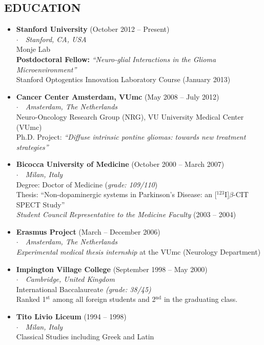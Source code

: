 \documentclass[line,margin]{res}
\newcommand{\superscript}[1]{\ensuremath{^{\textrm{#1}}}}
\newcommand{\titlestyle}[1]{{\bf #1}}
\newcommand{\placestyle}[1]{\footnotesize $\cdot$\ \ {\emph{#1}}}
\newcommand{\datestyle}[1]{{\tiny \dotfill} {\small (#1)}}
\begin{document}
\begin{resume}
\section{EDUCATION}
\begin{itemize}
\item {
  \titlestyle{Stanford University} \datestyle{October 2012 -- Present} \\
  { \placestyle{Stanford, CA, USA} } \\
  Monje Lab \\
  {\bf Postdoctoral Fellow:} \emph{``Neuro-glial Interactions in the Glioma Microenvironment''} \\
  Stanford Optogentics Innovation Laboratory Course \datestyle{January 2013}
}
\item {
  \titlestyle{Cancer Center Amsterdam, VUmc} \datestyle{May 2008 -- July 2012} \\
  { \placestyle{Amsterdam, The Netherlands} } \\
  Neuro-Oncology Research Group (NRG), VU University Medical Center (VUmc) \\
  Ph.D. Project: \emph{``Diffuse intrinsic pontine gliomas: towards new treatment strategies''}
}
\item {
  \titlestyle{Bicocca University of Medicine} \datestyle{October 2000 -- March 2007} \\
  { \placestyle{Milan, Italy} } \\
  Degree: Doctor of Medicine (\emph{grade: 109/110}) \\
  Thesis: {\small ``Non-dopaminergic systems in Parkinson's Disease: an [\superscript{123}I]$\beta$-CIT SPECT Study''} \\
  \emph{Student Council Representative to the Medicine Faculty} \datestyle{2003 -- 2004}
}
\item {
  \titlestyle{Erasmus Project} \datestyle{March -- December 2006} \\
  { \placestyle{Amsterdam, The Netherlands} } \\
  \emph{Experimental medical thesis internship} at the VUmc (Neurology Department)
}
\item {
  \titlestyle{Impington Village College} \datestyle{September 1998 -- May 2000} \\
  { \placestyle{Cambridge, United Kingdom} } \\
  International Baccalaureate \emph{(grade: 38/45)} \\
  Ranked 1\superscript{st} among all foreign students and 2\superscript{nd} in the graduating class.
}
\item {
  \titlestyle{Tito Livio Liceum} \datestyle{1994 -- 1998} \\
  { \placestyle{Milan, Italy} } \\
  Classical Studies including Greek and Latin
}
\end{itemize}


\end{resume}
\end{document}
